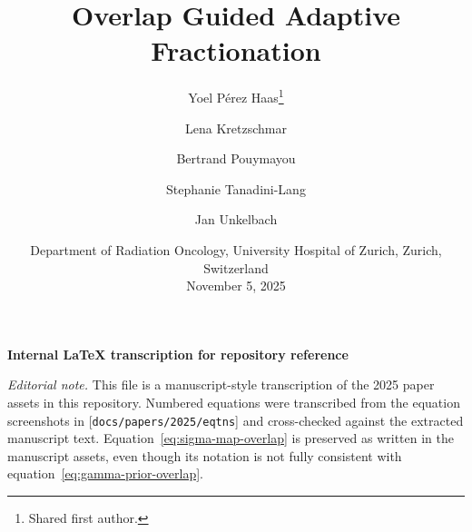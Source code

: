 \documentclass[11pt]{article}
\title{Overlap Guided Adaptive Fractionation}
\author{
  Yoel P\'erez Haas\thanks{Shared first author.} \and
  Lena Kretzschmar\footnotemark[1] \and
  Bertrand Pouymayou \and
  Stephanie Tanadini-Lang \and
  Jan Unkelbach
}
\date{
  Department of Radiation Oncology, University Hospital of Zurich, Zurich, Switzerland\\
  \vspace{0.5em}
  November 5, 2025
}
\begin{document}
\maketitle

\begin{center}
\textbf{Internal LaTeX transcription for repository reference}
\end{center}

\noindent\textit{Editorial note.} This file is a manuscript-style transcription of the 2025 paper assets in this repository. Numbered equations were transcribed from the equation screenshots in [\texttt{docs/papers/2025/eqtns}] and cross-checked against the extracted manuscript text. Equation~\eqref{eq:sigma-map-overlap} is preserved as written in the manuscript assets, even though its notation is not fully consistent with equation~\eqref{eq:gamma-prior-overlap}.
\end{document}
